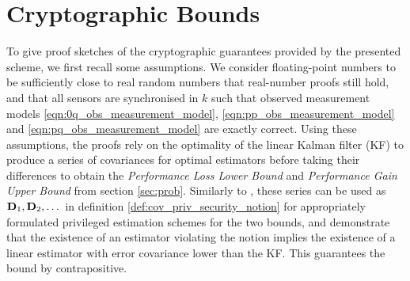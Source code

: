 \documentclass[letterpaper, 10 pt, conference]{ieeeconf}
\begin{document}
% 
%                                                                   
%                                                                   
%                                                                   
% 

\section{Cryptographic Bounds}\label{sec:crypto}
To give proof sketches of the cryptographic guarantees provided by the presented scheme, we first recall some assumptions. We consider floating-point numbers to be sufficiently close to real random numbers that real-number proofs still hold, and that all sensors are synchronised in $k$ such that observed measurement models \eqref{eqn:0q_obs_measurement_model}, \eqref{eqn:pp_obs_measurement_model} and \eqref{eqn:pq_obs_measurement_model} are exactly correct. Using these assumptions, the proofs rely on the optimality of the linear Kalman filter (KF) \cite{haugBayesianEstimationTracking2012} to produce a series of covariances for optimal estimators before taking their differences to obtain the \textit{Performance Loss Lower Bound} and \textit{Performance Gain Upper Bound} from section \ref{sec:prob}. Similarly to \cite{risticCryptographicallyPrivilegedState2022}, these series can be used as ${{\mathbf{D}}}_1,{{\mathbf{D}}}_2,\dots$ in definition \ref{def:cov_priv_security_notion} for appropriately formulated privileged estimation schemes for the two bounds, and demonstrate that the existence of an estimator violating the notion implies the existence of a linear estimator with error covariance lower than the KF. This guarantees the bound by contrapositive.

% 
% 
\end{document}
